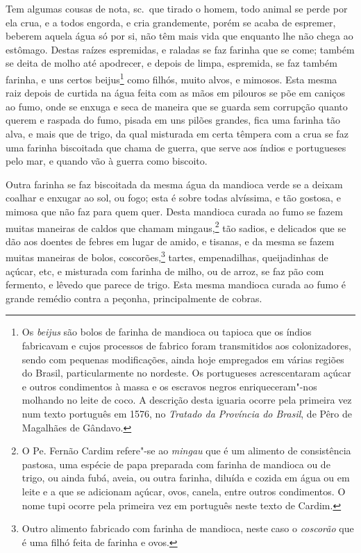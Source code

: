  Tem algumas cousas de nota, sc.~que tirado o homem, todo animal se
perde por ela crua, e a todos engorda, e cria grandemente, porém se
acaba de espremer, beberem aquela água só por si, não têm mais vida que
enquanto lhe não chega ao estômago. Destas raízes espremidas, e raladas
se faz farinha que se come; também se deita de molho até apodrecer, e
depois de limpa, espremida, se faz também farinha, e uns certos 
beijus\footnote{ Os \textit{beijus} são bolos de farinha de mandioca ou
tapioca que os índios fabricavam e cujos processos de fabrico foram
transmitidos aos colonizadores, sendo com pequenas modificações, ainda
hoje empregados em várias regiões do Brasil, particularmente no
nordeste. Os portugueses acrescentaram açúcar e outros condimentos à
massa e os escravos negros enriqueceram"-nos molhando no leite de coco.
A descrição desta iguaria ocorre pela primeira vez num texto português
em 1576, no \textit{Tratado da Província do Brasil}, de Pêro de Magalhães de 
Gândavo.} como filhós, muito alvos, e mimosos. Esta mesma raiz depois
de curtida na água feita com as mãos em pilouros se põe em caniços ao
fumo, onde se enxuga e seca de maneira que se guarda sem corrupção
quanto querem e raspada do fumo, pisada em uns pilões grandes, fica uma
farinha tão alva, e mais que de trigo, da qual misturada em certa
têmpera com a crua se faz uma farinha biscoitada que chama de guerra,
que serve aos índios e portugueses pelo mar, e quando vão à guerra como biscoito. 

 Outra farinha se faz biscoitada da mesma água da mandioca verde se a 
deixam coalhar e enxugar ao sol, ou fogo; esta é sobre todas alvíssima,
e tão gostosa, e mimosa que não faz para quem quer. Desta mandioca
curada ao fumo se fazem muitas maneiras de caldos que chamam
mingaus,\footnote{ O Pe. Fernão Cardim refere"-se ao \textit{mingau} que
é um alimento de consistência pastosa, uma espécie de papa preparada
com farinha de mandioca ou de trigo, ou ainda fubá, aveia, ou outra
farinha, diluída e cozida em água ou em leite e a que se adicionam
açúcar, ovos, canela, entre outros condimentos. O nome tupi ocorre pela
primeira vez em português neste texto de Cardim.} tão sadios, e
delicados que se dão aos doentes de febres em lugar de amido, e
tisanas, e da mesma se fazem muitas maneiras de bolos, 
coscorões,\footnote{ Outro alimento fabricado com farinha de mandioca, neste caso
o \textit{coscorão} que é uma filhó feita de farinha e ovos.} tartes,
empenadilhas, queijadinhas de açúcar, etc, e misturada com farinha de
milho, ou de arroz, se faz pão com fermento, e lêvedo que parece de
trigo. Esta mesma mandioca curada ao fumo é grande remédio contra a
peçonha, principalmente de cobras. 

